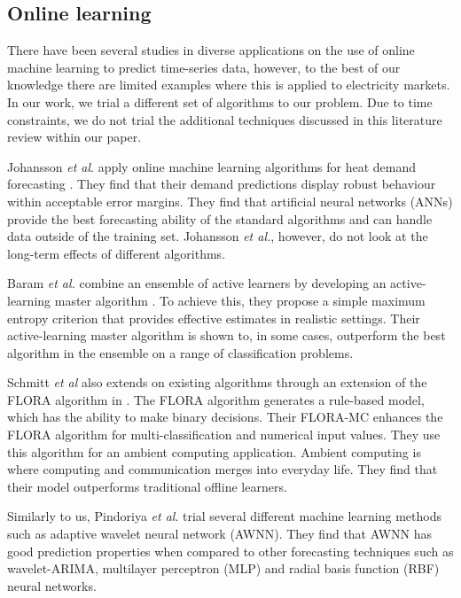 \documentclass[final,3p,times,twocolumn,numbers]{elsarticle}
\begin{document}
\subsection{Online learning}

There have been several studies in diverse applications on the use of online machine learning to predict time-series data, however, to the best of our knowledge there are limited examples where this is applied to electricity markets. In our work, we trial a different set of algorithms to our problem. Due to time constraints, we do not trial the additional techniques discussed in this literature review within our paper. 

Johansson \textit{et al}. apply online machine learning algorithms for heat demand forecasting \cite{Johansson2017}. They find that their demand predictions display robust behaviour within acceptable error margins. They find that artificial neural networks (ANNs) provide the best forecasting ability of the standard algorithms and can handle data outside of the training set. Johansson \textit{et al.}, however, do not look at the long-term effects of different algorithms.

Baram \textit{et al.} combine an ensemble of active learners by developing an active-learning master algorithm \cite{Baram2003}. To achieve this, they propose a simple maximum entropy criterion that provides effective estimates in realistic settings. Their active-learning master algorithm is shown to, in some cases, outperform the best algorithm in the ensemble on a range of classification problems.

Schmitt \textit{et al} also extends on existing algorithms through an extension of the FLORA algorithm in \cite{Schmitt2008, Widmer1996}. The FLORA algorithm generates a rule-based model, which has the ability to make binary decisions. Their FLORA-MC enhances the FLORA algorithm for multi-classification and numerical input values. They use this algorithm for an ambient computing application. Ambient computing is where computing and communication merges into everyday life. They find that their model outperforms traditional offline learners.

Similarly to us, Pindoriya \textit{et al}. trial several different machine learning methods such as adaptive wavelet neural network (AWNN). They find that AWNN has good prediction properties when compared to other forecasting techniques such as wavelet-ARIMA, multilayer perceptron (MLP) and radial basis function (RBF) neural networks.
\end{document}
